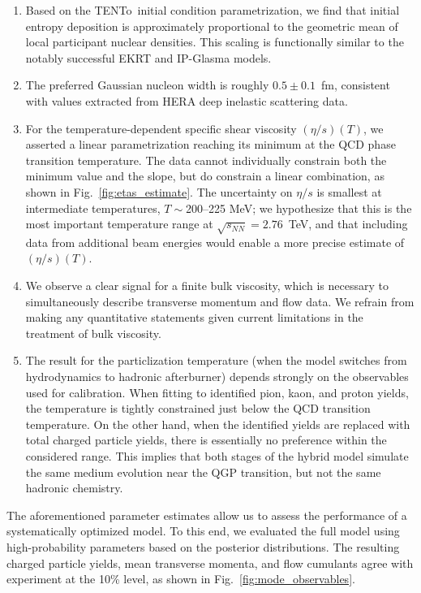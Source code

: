 \documentclass[aps,prc,reprint,amsmath,nofootinbib]{revtex4-1}
\newcommand{\trento}{T\raisebox{-0.5ex}{R}ENTo}
\newcommand{\sqrts}{\sqrt{s_{NN}}}
\begin{document}
\begin{enumerate}[itemsep=0pt, leftmargin=2\parindent]
  \item
    Based on the \trento\ initial condition parametrization, we find that initial entropy deposition is approximately proportional to the geometric mean of local participant nuclear densities.
    This scaling is functionally similar to the notably successful EKRT and IP-Glasma models.
  \item
    The preferred Gaussian nucleon width is roughly $0.5 \pm 0.1$~fm, consistent with values extracted from HERA deep inelastic scattering data.
  \item
    For the temperature-dependent specific shear viscosity $(\eta/s)(T)$, we asserted a linear parametrization reaching its minimum at the QCD phase transition temperature.
    The data cannot individually constrain both the minimum value and the slope, but do constrain a linear combination, as shown in Fig.~\ref{fig:etas_estimate}.
    The uncertainty on $\eta/s$ is smallest at intermediate temperatures, $T \sim {}$200--225 MeV;
    we hypothesize that this is the most important temperature range at $\sqrts = 2.76$~TeV,
    and that including data from additional beam energies would enable a more precise estimate of $(\eta/s)(T)$.
  \item
    We observe a clear signal for a finite bulk viscosity, which is necessary to simultaneously describe transverse momentum and flow data.
    We refrain from making any quantitative statements given current limitations in the treatment of bulk viscosity.
  \item
    The result for the particlization temperature (when the model switches from hydrodynamics to hadronic afterburner) depends strongly on the observables used for calibration.
    When fitting to identified pion, kaon, and proton yields, the temperature is tightly constrained just below the QCD transition temperature.
    On the other hand, when the identified yields are replaced with total charged particle yields, there is essentially no preference within the considered range.
    This implies that both stages of the hybrid model simulate the same medium evolution near the QGP transition, but not the same hadronic chemistry.
\end{enumerate}

The aforementioned parameter estimates allow us to assess the performance of a systematically optimized model.
To this end, we evaluated the full model using high-probability parameters based on the posterior distributions.
The resulting charged particle yields, mean transverse momenta, and flow cumulants agree with experiment at the 10\% level, as shown in Fig.~\ref{fig:mode_observables}.
\end{document}
